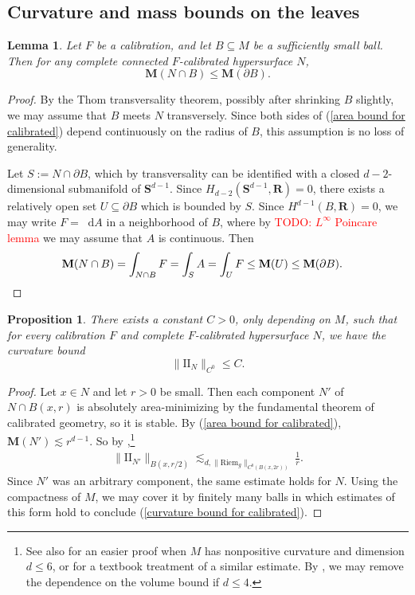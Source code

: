 \documentclass[reqno,11pt]{amsart}
\newcommand{\RR}{\mathbf{R}}
\newcommand{\Sph}{\mathbf S}
\newcommand*\dif{\mathop{}\!\mathrm{d}}
\newcommand{\Two}{\mathrm{I\!I}}
\newcommand{\Riem}{\mathrm{Riem}}
\newcommand{\Mass}{\mathbf M}
\newtheorem{lemma}[theorem]{Lemma}
\newtheorem{proposition}[theorem]{Proposition}
\theoremstyle{definition}
\numberwithin{equation}{section}
\newcommand\todo[1]{\textcolor{red}{TODO: #1}}
\begin{document}
\subsection{Curvature and mass bounds on the leaves}
\begin{lemma}
Let $F$ be a calibration, and let $B \subseteq M$ be a sufficiently small ball.
Then for any complete connected $F$-calibrated hypersurface $N$, 
\begin{equation}\label{area bound for calibrated}
\Mass(N \cap B) \leq \Mass(\partial B).
\end{equation}
\end{lemma}
\begin{proof}
By the Thom transversality theorem, possibly after shrinking $B$ slightly, we may assume that $B$ meets $N$ transversely.
Since both sides of (\ref{area bound for calibrated}) depend continuously on the radius of $B$, this assumption is no loss of generality.

Let $S := N \cap \partial B$, which by transversality can be identified with a closed $d - 2$-dimensional submanifold of $\Sph^{d - 1}$.
Since $H_{d - 2}(\Sph^{d - 1}, \RR) = 0$, there exists a relatively open set $U \subseteq \partial B$ which is bounded by $S$.
Since $H^{d - 1}(B, \RR) = 0$, we may write $F = \dif A$ in a neighborhood of $B$, where by \todo{$L^\infty$ Poincare lemma} we may assume that $A$ is continuous.
Then
\begin{align*}
\Mass(N \cap B) &= \int_{N \cap B} F = \int_S A = \int_U F \leq \Mass(U) \leq \Mass(\partial B). \qedhere
\end{align*}
\end{proof}

\begin{proposition}
There exists a constant $C > 0$, only depending on $M$, such that for every calibration $F$ and complete $F$-calibrated hypersurface $N$, we have the curvature bound
\begin{equation}\label{curvature bound for calibrated}
\|\Two_N\|_{C^0} \leq C.
\end{equation}
\end{proposition}
\begin{proof}
Let $x \in N$ and let $r > 0$ be small.
Then each component $N'$ of $N \cap B(x, r)$ is absolutely area-minimizing by the fundamental theorem of calibrated geometry, so it is stable.
By (\ref{area bound for calibrated}), $\Mass(N') \lesssim r^{d - 1}$.
So by \cite[pg785, Corollary 1]{Schoen81},\footnote{See also \cite[Theorem 3]{Schoen75} for an easier proof when $M$ has nonpositive curvature and dimension $d \leq 6$, or \cite[Chapter 2, \S\S4-5]{colding2011course} for a textbook treatment of a similar estimate. By \cite[Lemma 2.4]{chodosh2022complete}, we may remove the dependence on the volume bound if $d \leq 4$.}
\begin{align*}
\|\Two_{N'}\|_{B(x, r/2)} \lesssim_{d, \|\Riem_g\|_{C^0(B(x, 2r))}} \frac{1}{r}.
\end{align*}
Since $N'$ was an arbitrary component, the same estimate holds for $N$.
Using the compactness of $M$, we may cover it by finitely many balls in which estimates of this form hold to conclude (\ref{curvature bound for calibrated}).
\end{proof}
\end{document}
